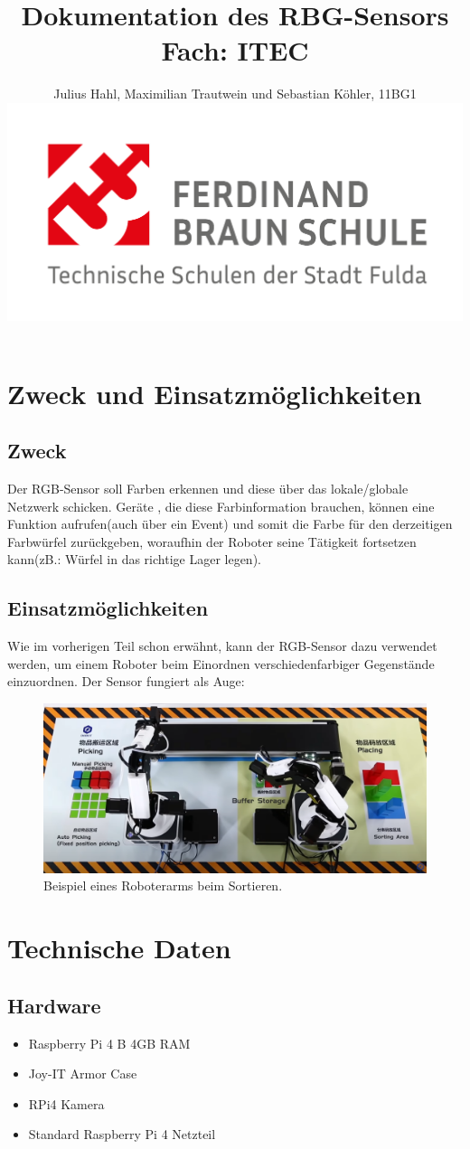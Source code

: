 \documentclass[12pt, a4paper]{article}
\title{Dokumentation des RBG-Sensors \break Fach: ITEC}
\author{Julius Hahl, Maximilian Trautwein und Sebastian Köhler, 11BG1 \\ \includegraphics[width=\textwidth]{fbs_logo.pdf}}
\begin{document}
	
	\maketitle
	\newpage
	
	\tableofcontents
	\newpage
	
	\section{Zweck und Einsatzmöglichkeiten}
	\subsection{Zweck}
	Der RGB-Sensor soll Farben erkennen und diese über das lokale/globale Netzwerk schicken. Geräte , die diese Farbinformation brauchen, können eine Funktion aufrufen(auch über ein Event) und somit die Farbe für den derzeitigen Farbwürfel zurückgeben, woraufhin der Roboter seine Tätigkeit fortsetzen kann(zB.: Würfel in das richtige Lager legen).
	\subsection{Einsatzmöglichkeiten}
	Wie im vorherigen Teil schon erwähnt, kann der RGB-Sensor dazu verwendet werden, um einem Roboter beim Einordnen verschiedenfarbiger Gegenstände einzuordnen. Der Sensor fungiert als Auge:
	\\
	\begin{figure}[h]
		\centering
		
		\includegraphics[width=\textwidth, frame]{roboter.png}
		\caption{Beispiel eines Roboterarms beim Sortieren.}
	\end{figure}
	\newpage
	
	\section{Technische Daten}
	\subsection{Hardware}
	\begin{itemize}
		\item Raspberry Pi 4 B 4GB RAM 
		\item Joy-IT Armor Case 
		\item RPi4 Kamera
		\item Standard Raspberry Pi 4 Netzteil
	\end{itemize}
\end{document}
